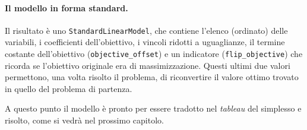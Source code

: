 \paragraph{Il modello in forma standard.}
Il risultato è uno \texttt{StandardLinearModel},
che contiene l'elenco (ordinato) delle variabili, i coefficienti dell'obiettivo,
i vincoli ridotti a uguaglianze, il termine costante dell'obiettivo
(\texttt{objective\_offset}) e un indicatore (\texttt{flip\_objective}) che
ricorda se l'obiettivo originale era di massimizzazione. Questi ultimi due valori
permettono, una volta risolto il problema, di riconvertire il valore ottimo
trovato in quello del problema di partenza.

A questo punto il modello è pronto per essere tradotto nel \emph{tableau} del
simplesso e risolto, come si vedrà nel prossimo capitolo.
